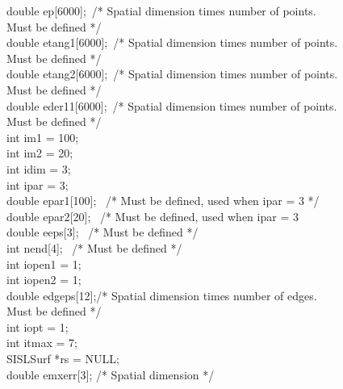                 \>\>    double \> {\fov ep}[6000];\, /* Spatial dimension times number of points.\\
                \>\>\>\>\>\> Must be defined */\\
                \>\>    double \> {\fov etang1}[6000];\, /* Spatial dimension times number of points.\\
                \>\>\>\>\>\> Must be defined */\\
                \>\>    double \> {\fov etang2}[6000];\, /* Spatial dimension times number of points.\\
                \>\>\>\>\>\> Must be defined */\\
                \>\>    double \> {\fov eder11}[6000];\, /* Spatial dimension times number of points.\\
                \>\>\>\>\>\> Must be defined */\\
                \>\>    int    \>  {\fov im1} = 100;\\
                \>\>    int    \>  {\fov im2} = 20;\\
                \>\>    int    \>  {\fov idim} = 3;\\
                \>\>    int    \>  {\fov ipar} = 3;\\
                \>\>    double \> {\fov epar1}[100]; \, /* Must be defined, used when ipar = 3 */\\
                \>\>    double \> {\fov epar2}[20]; \, /* Must be defined, used when ipar = 3 \\
                \>\>    double \> {\fov eeps}[3]; \, /* Must be defined */\\
                \>\>    int    \>  {\fov nend}[4]; \, /* Must be defined */\\
                \>\>    int    \>  {\fov iopen1} = 1;\\
                \>\>    int    \>  {\fov iopen2} = 1;\\
                \>\>    double \> {\fov edgeps}[12];/* Spatial dimension times number of edges. \\
                \>\>\>\>\>\> Must be defined */\\
                \>\>    int    \>  {\fov iopt} = 1;\\
                \>\>    int    \>  {\fov itmax} = 7;\\
                \>\>    SISLSurf    \>  *{\fov rs} = NULL;\\
                \>\>    double \> {\fov emxerr}[3]; /* Spatial dimension */\\

